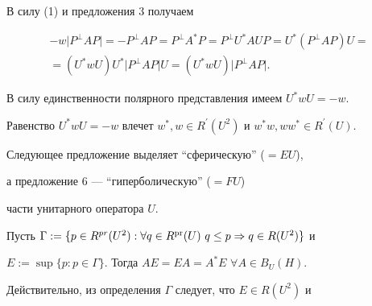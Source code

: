 \begin{pf}


В силу (1) и предложения 3 получаем


\begin{multline*}


-w\vert P^{\perp} AP\vert =-P^{\perp}AP=P^{\perp}A^{*}P=P^{\perp}U^{*}AUP=


U^{*}(P^{\perp}AP)U=\\


%


=(U^{*}wU)U^{*}\vert P^{\perp}AP\vert U=(U^{*}wU)


\vert P^{\perp}AP\vert .


\end{multline*}


В силу единственности полярного представления имеем $U^{*}wU=-w$.


\end{pf}





\begin{note}


Равенство $U^{*}wU=-w$ влечет $w^{*},


w\in R^{\prime}(U^{2})$ и $w^{*}w, ww^{*}\in R^{\prime}(U)$.


\end{note}





Следующее предложение выделяет ``сферическую'' (${=}EU$),


а предложение 6 --- ``гиперболическую'' (${=}FU$)


части унитарного оператора $U$.





\begin{prop}


Пусть $\Gamma:=\{p\in R^{pr}(U^{2}):\forall q\in


R^{\pr}(U)\ q\leq p \Rightarrow q\in R(U^{2})\}$ и


$E:=\sup\{p:p\in\Gamma\}$. Тогда $AE=EA=A^{*}E$ $\forall A\in B_{U}(H)$.


\end{prop}





Действительно, из определения $\Gamma$ следует, что $E\in R(U^{2})$ и


$$


